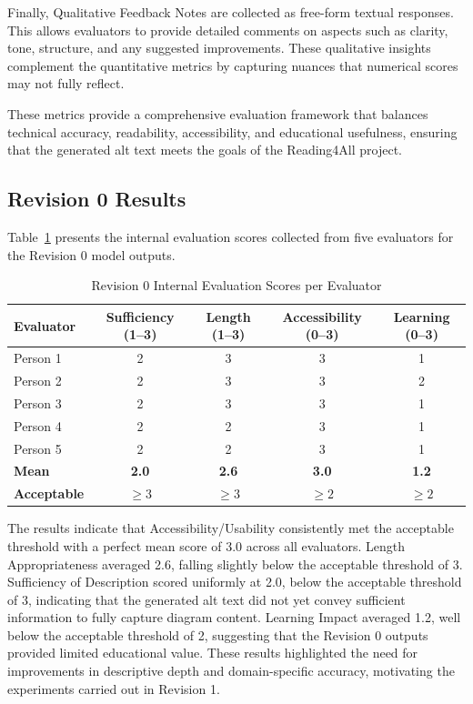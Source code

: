 \documentclass[11pt]{article}
\begin{document}
Finally, Qualitative Feedback Notes are collected as free-form textual responses. This allows evaluators to provide detailed comments on aspects such 
as clarity, tone, structure, and any suggested improvements. These qualitative insights complement the quantitative metrics by capturing nuances that 
numerical scores may not fully reflect.

These metrics provide a comprehensive evaluation framework that balances technical accuracy, readability, accessibility, and educational 
usefulness, ensuring that the generated alt text meets the goals of the Reading4All project.

\subsection{Revision 0 Results}

Table~\ref{tab:rev0} presents the internal evaluation scores collected from five evaluators for the Revision 0 model outputs.

\begin{table}[t]
\centering
\caption{Revision 0 Internal Evaluation Scores per Evaluator}
\label{tab:rev0}
\begin{tabular}{lcccc}
\toprule
\textbf{Evaluator} & \textbf{Sufficiency (1--3)} & \textbf{Length (1--3)} & \textbf{Accessibility (0--3)} & \textbf{Learning (0--3)} \\
\midrule
Person 1 & 2 & 3 & 3 & 1 \\
Person 2 & 2 & 3 & 3 & 2 \\
Person 3 & 2 & 3 & 3 & 1 \\
Person 4 & 2 & 2 & 3 & 1 \\
Person 5 & 2 & 2 & 3 & 1 \\
\midrule
\textbf{Mean}       & \textbf{2.0} & \textbf{2.6} & \textbf{3.0} & \textbf{1.2} \\
\textbf{Acceptable} & $\geq 3$     & $\geq 3$     & $\geq 2$     & $\geq 2$     \\
\bottomrule
\end{tabular}
\end{table}

The results indicate that Accessibility/Usability consistently met the acceptable threshold 
with a perfect mean score of 3.0 across all evaluators. Length Appropriateness averaged 
2.6, falling slightly below the acceptable threshold of 3. Sufficiency of Description 
scored uniformly at 2.0, below the acceptable threshold of 3, indicating that the 
generated alt text did not yet convey sufficient information to fully capture diagram 
content. Learning Impact averaged 1.2, well below the acceptable threshold of 2, 
suggesting that the Revision 0 outputs provided limited educational value. These 
results highlighted the need for improvements in descriptive depth and domain-specific 
accuracy, motivating the experiments carried out in Revision 1.
\end{document}
